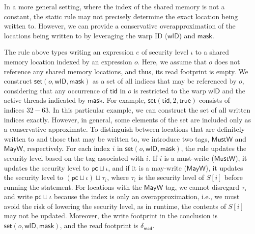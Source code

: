 In a more general setting, where the index of the shared memory is not a constant, the static rule may not precisely determine the exact location being written to. 
% 
However, we can provide a conservative overapproximation of the locations being written to by leveraging the warp ID ($\mathsf{wID}$) and $\mathsf{mask}$.
{\small\begin{mathpar}
    \end{mathpar}}
% 
The rule above types writing an expression $e$ of security level $\iota$ to a shared memory location indexed by an expression $o$.
%
Here, we assume that $o$ does not reference any shared memory locations, and thus, its read footprint is empty.
%
We construct  $\mathsf{set}(o, \mathsf{wID}, \mathsf{mask})$ as a set of all indices that may be referenced by $o$, considering that any occurrence of $\mathsf{tid}$ in $o$ is restricted to the warp $\mathsf{wID}$ and the active threads indicated by $\mathsf{mask}$. 
%
For example, $\mathsf{set}(\mathsf{tid}, 2, \mathsf{true})$ consists of indices $32-63$.
%
In this particular example, we can construct the set of all written indices exactly.
%
However, in general, some elements of the set are included only as a conservative approximate.
%
To distinguish between locations that are definitely written to and those that may be written to, we introduce two tags, $\mathsf{MustW}$ and $\mathsf{MayW}$, respectively.
%
For each index $i$ in $\mathsf{set}(o, \mathsf{wID}, \mathsf{mask})$, the rule updates the security level based on the tag associated with $i$.
%
If $i$ is a must-write ($\mathsf{MustW}$), it updates the security level to $\mathsf{pc} \sqcup \iota$, and if it is a may-write ($\mathsf{MayW}$), it updates the security level to $(\mathsf{pc} \sqcup \iota) \sqcup \tau_i$, where $\tau_i$ is the security level of $S[i]$ before running the statement.
%
For locations with the $\mathsf{MayW}$ tag, we cannot disregard $\tau_i$ and write $\mathsf{pc} \sqcup \iota$ because the index is only an overapproximation, i.e., we must avoid the risk of lowering the security level, as in runtime,  the contents of $S[i]$ may not be updated.
%
Moreover, the write footprint in the conclusion is $\mathsf{set}(o, \mathsf{wID}, \mathsf{mask})$, and the read footprint is $\delta_{\mathsf{read}}$.

